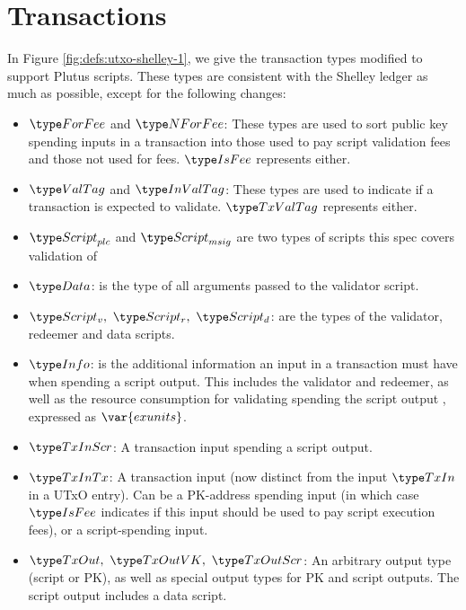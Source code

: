 \section{Transactions}
\label{sec:transactions}

In Figure \ref{fig:defs:utxo-shelley-1}, we give the transaction types modified
to support Plutus scripts. These types are consistent with the Shelley ledger
as much as possible,
except for the following changes:

\begin{itemize}
  \item $\ForFee$ and $\NForFee$: These types are used to sort public key
  spending inputs in a transaction into those used to pay script validation
  fees and those not used
  for fees. $\IsFee$ represents either.

  \item $\ValTag$ and $\InValTag$: These types are used to indicate if a
  transaction is expected to validate.
  $\TxValTag$ represents either.

  \item $\ScriptPlutus$ and $\ScriptMSig$ are two types of scripts this spec
  covers validation of

  \item $\Data$: is the type of all arguments passed to the validator script.

  \item $\ScriptV,~ \ScriptR,~ \ScriptD$: are the types of the validator,
  redeemer and data scripts.

  \item $\Info$: is the additional information an input in a transaction must
  have when spending a script output. This includes the validator and redeemer,
  as well as the resource consumption for validating spending the script output
  , expressed as $\var{exunits}$.

  \item $\TxInScr$: A transaction input spending a script output.

  \item $\TxInTx$: A transaction input (now distinct from the input $\TxIn$ in
  a UTxO entry). Can be a PK-address spending input
  (in which case $\IsFee$ indicates if this input should be used to pay script execution
  fees), or a script-spending input.

  \item $\TxOut,~\TxOutVK,~\TxOutScr$: An arbitrary output type (script or PK),
  as well as special output types for PK and script outputs. The script output
  includes a data script.
\end{itemize}

